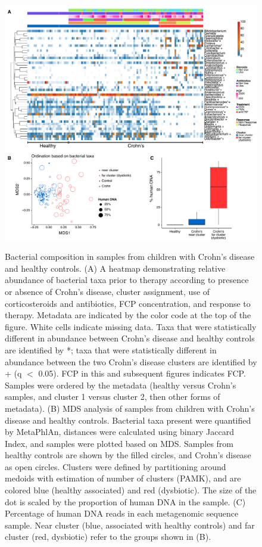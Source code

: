 \begin{figure}[p]
\centering
{\includegraphics[scale=0.37,trim=0 0 0 0,clip]{Figure/Fig21_Microbiome_Cluster_Heatmap.pdf}}
\caption[Bacterial composition in samples from children with Crohn's disease and healthy controls]{Bacterial composition in samples from children with Crohn's disease and healthy controls. (A) A heatmap demonstrating relative abundance of bacterial taxa prior to therapy according to presence or absence of Crohn's disease, cluster assignment, use of corticosteroids and antibiotics, FCP concentration, and response to therapy. Metadata are indicated by the color code at the top of the figure. White cells indicate missing data. Taxa that were statistically different in abundance between Crohn's disease and healthy controls are identified by *; taxa that were statistically different in abundance between the two Crohn's disease clusters are identified by + (q $<$ 0.05). FCP in this and subsequent figures indicates FCP. Samples were ordered by the metadata (healthy versus Crohn's samples, and cluster 1 versus cluster 2, then other forms of metadata).
(B) MDS analysis of samples from children with Crohn's disease and healthy controls. Bacterial taxa present were quantified by MetaPhlAn, distances were calculated using binary Jaccard Index, and samples were plotted based on MDS. Samples from healthy controls are shown by the filled circles, and Crohn's disease as open circles. Clusters were defined by partitioning around medoids with estimation of number of clusters (PAMK), and are colored blue (healthy associated) and red (dysbiotic). The size of the dot is scaled by the proportion of human DNA in the sample.
(C) Percentage of human DNA reads in each metagenomic sequence sample. Near cluster (blue, associated with healthy controls) and far cluster (red, dysbiotic) refer to the groups shown in (B). }
\label{Fig21_Microbiome_Cluster_Heatmap}
\end{figure}


